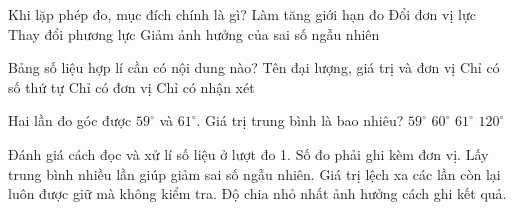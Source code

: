 \begin{ex}
Khi lặp phép đo, mục đích chính là gì?
\choice
{Làm tăng giới hạn đo}
{Đổi đơn vị lực}
{Thay đổi phương lực}
{\True Giảm ảnh hưởng của sai số ngẫu nhiên}
\end{ex}

\begin{ex}
Bảng số liệu hợp lí cần có nội dung nào?
\choice
{\True Tên đại lượng, giá trị và đơn vị}
{Chỉ có số thứ tự}
{Chỉ có đơn vị}
{Chỉ có nhận xét}
\end{ex}

\begin{ex}
Hai lần đo góc được $59^\circ$ và $61^\circ$. Giá trị trung bình là bao nhiêu?
\choice
{$59^\circ$}
{\True $60^\circ$}
{$61^\circ$}
{$120^\circ$}
\end{ex}

\begin{ex}
Đánh giá cách đọc và xử lí số liệu ở lượt đo 1.
\choiceTF
{\True Số đo phải ghi kèm đơn vị.}
{\True Lấy trung bình nhiều lần giúp giảm sai số ngẫu nhiên.}
{Giá trị lệch xa các lần còn lại luôn được giữ mà không kiểm tra.}
{\True Độ chia nhỏ nhất ảnh hưởng cách ghi kết quả.}
\end{ex}

